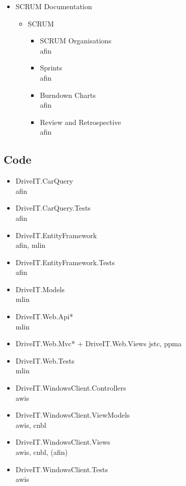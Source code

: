 \begin{itemize}
	\item SCRUM Documentation
	\begin{itemize}
		\item SCRUM
		\begin{itemize}
			\item SCRUM Organisations\\
			afin
			\item Sprints\\
			afin
			\item Burndown Charts\\
			afin
			\item Review and Retrospective\\
			afin
		\end{itemize}
	\end{itemize}
\end{itemize}
\subsection{Code}
\begin{itemize}
	\item DriveIT.CarQuery\\
	afin
	\item DriveIT.CarQuery.Tests\\
	afin
	\item DriveIT.EntityFramework\\
	afin, mlin
	\item DriveIT.EntityFramework.Tests\\
	afin
	\item DriveIT.Models\\
	mlin
	\item DriveIT.Web.Api*\\
	mlin
	\item DriveIT.Web.Mvc* + DriveIT.Web.Views
	jstc, ppma
	\item DriveIT.Web.Tests\\
	mlin
	\item DriveIT.WindowsClient.Controllers\\
	awis
	\item DriveIT.WindowsClient.ViewModels\\
	awis, cnbl
	\item DriveIT.WindowsClient.Views\\
	awis, cnbl, (afin)
	\item DriveIT.WindowsClient.Tests\\
	awis
\end{itemize}